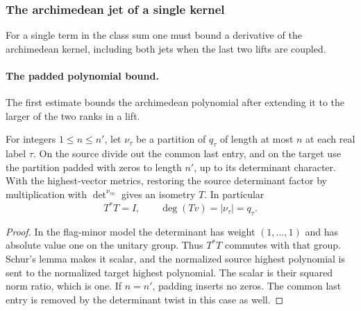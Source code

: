 \subsubsection{The archimedean jet of a single kernel}
\label{subsec:selected-kernel-jets}

For a single term in the class sum one must bound a derivative of the archimedean kernel, including both jets when the last two lifts are coupled.

\paragraph{The padded polynomial bound.}

The first estimate bounds the archimedean polynomial after extending it to the larger of the two ranks in a lift.

\begin{established}\label{hyp:padded-Gaussian-jets}
For integers \(1\le n\le n'\), let \(\nu_\tau\) be a partition of
\(q_\tau\) of length at most \(n\) at each real label \(\tau\).
On the source divide out the common last entry, and on the target
use the partition padded with zeros to length \(n'\), up to its
determinant character. With the highest-vector metrics, restoring
the source determinant factor by multiplication with
\(\det^{\nu_{\tau n}}\) gives an isometry \(T\). In particular
\[
               T^*T=I,\qquad \deg(Tv)=|\nu_\tau|=q_\tau .
\]
\end{established}
\begin{proof}
In the flag-minor model the determinant has weight \((1,\ldots,1)\)
and has absolute value one on the unitary group. Thus \(T^*T\)
commutes with that group. Schur's lemma makes it scalar, and the
normalized source highest polynomial is sent to the normalized
target highest polynomial. The scalar is their squared norm ratio,
which is one. If \(n=n'\), padding inserts no zeros. The common
last entry is removed by the determinant twist in this case as well.
\end{proof}


